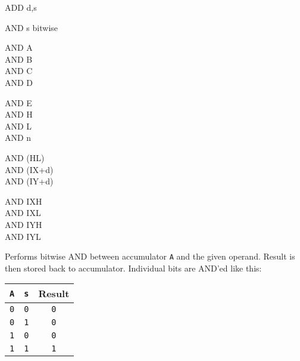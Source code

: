 \begin{basedescript}{
    \desclabelstyle{\multilinelabel}
    \desclabelwidth{3cm}}
\begin{DetailItem}{ADD d,s}
    \end{DetailItem}

    \begin{DetailItem}{AND s}
        {bitwise }
        {}

        \begin{DetailVariants}[4]
            AND A\\
            AND B\\
            AND C\\
            AND D

            \columnbreak
            AND E\\
            AND H\\
            AND L\\
            AND n
			
            \columnbreak
            AND (HL)\\
            AND (IX+d)\\
            AND (IY+d)

            \columnbreak
            AND IXH\UNDOC\\
            AND IXL\UNDOC\\
            AND IYH\UNDOC\\
            AND IYL\UNDOC
        \end{DetailVariants}

        Performs bitwise AND between accumulator {\tt A} and the given operand. Result is then stored back to accumulator. Individual bits are AND'ed like this:

        \begin{tabular}{cc|c}
            {\tt A} & {\tt s} & Result \\
            \hline
            {\tt 0} & {\tt 0} & {\tt 0} \\
            {\tt 0} & {\tt 1} & {\tt 0} \\
            {\tt 1} & {\tt 0} & {\tt 0} \\
            {\tt 1} & {\tt 1} & {\tt 1} \\
        \end{tabular}

        \begin{DetailEffects}[v]
            \FlagsANDr
        \end{DetailEffects}

        \begin{DetailTiming}
        \end{DetailTiming}


\end{DetailItem}
\end{basedescript}
